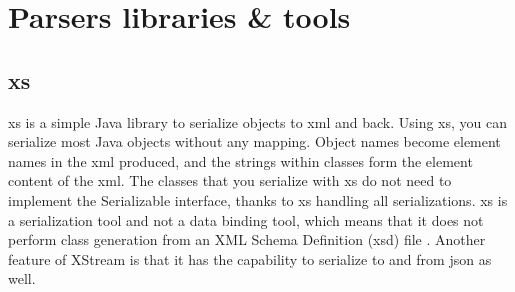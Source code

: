 \section{Parsers libraries \& tools}\label{sec:parsers}

\subsection{\gls{xs}}
\gls{xs} is a simple Java library to serialize objects to \gls{xml} and back. Using \gls{xs}, you can serialize most Java objects without any mapping. Object names become element names in the \gls{xml} produced, and the strings within classes form the element content of the \gls{xml}.
\newline
\newline
The classes that you serialize with \gls{xs} do not need to implement the Serializable interface, thanks to \gls{xs} handling all serializations. \gls{xs} is a serialization tool and not a data binding tool, which means that it does not perform class generation from an XML Schema Definition (\gls{xsd}) file \cite{bib:xstream} \cite{bib:ibm}.
\newline
\newline
Another feature of XStream is that it has the capability to serialize to and from \gls{json} as well.